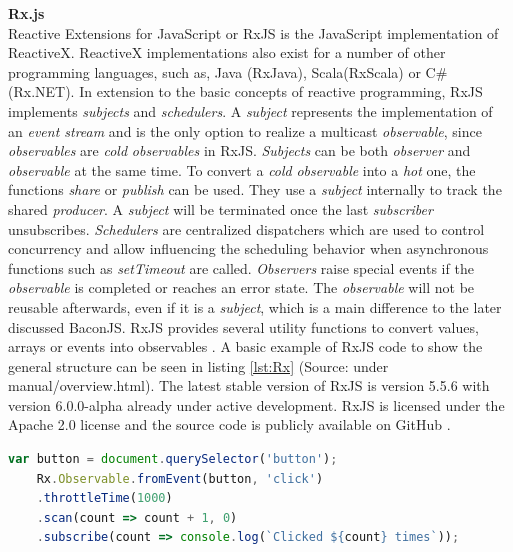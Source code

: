 	\textbf{Rx.js}\\
	Reactive Extensions for JavaScript or RxJS \cite{RxJS} is the JavaScript implementation of ReactiveX. ReactiveX implementations also exist for a number of other programming languages, such as, Java (RxJava), Scala(RxScala) or C\#(Rx.NET). In extension to the basic concepts of reactive programming, RxJS implements \emph{subjects} and \emph{schedulers}. A \emph{subject} represents the implementation of an \emph{event stream} and is the only option to realize a multicast \emph{observable}, since \emph{observables} are \emph{cold} \emph{observables} in RxJS. \emph{Subjects} can be both \emph{observer} and \emph{observable} at the same time. To convert a \emph{cold} \emph{observable} into a \emph{hot} one, the functions \emph{share} or \emph{publish} can be used. They use a \emph{subject} internally to track the shared \emph{producer}. A \emph{subject} will be terminated once the last \emph{subscriber} unsubscribes. \emph{Schedulers} are centralized dispatchers which are used to control concurrency and allow influencing the scheduling behavior when asynchronous functions such as \emph{setTimeout}\cite{RxJsDocu} are called. \emph{Observers} raise special events if the \emph{observable} is completed or reaches an error state. The \emph{observable} will not be reusable afterwards, even if it is a \emph{subject}, which is a main difference to the later discussed BaconJS. RxJS provides several utility functions to convert values, arrays or events into observables \cite{ThesisBaradur}. A basic example of RxJS code to show the general structure can be seen in listing \ref{lst:Rx} (Source: \cite{RxJsDocu} under manual/overview.html).
	The latest stable version of RxJS is version 5.5.6 with version 6.0.0-alpha already under active development. RxJS is licensed under the Apache 2.0 license and the source code is publicly available on GitHub \cite{RxJSRepo}.

	\begin{lstlisting}[language=JavaScript, caption={Example of RxJS code.},label={lst:Rx}]
	var button = document.querySelector('button');
	Rx.Observable.fromEvent(button, 'click')
	.throttleTime(1000)
	.scan(count => count + 1, 0)
	.subscribe(count => console.log(`Clicked ${count} times`));
	\end{lstlisting}
	

